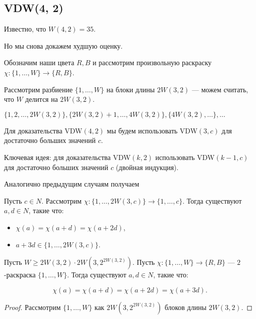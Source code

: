 \begin{normalsize}

\subsection{VDW(4, 2)}

Известно, что $W(4, 2) = 35$.

Но мы снова докажем худшую оценку.

Обозначим наши цвета $R, B$ и рассмотрим произвольную раскраску $\chi: \{1, \ldots, W\} \to \{R, B\}$.

Рассмотрим разбиение $\{1, \ldots, W\}$ на блоки длины $2W(3, 2)$ --- можем считать, что $W$ делится на $2W(3, 2)$.

$\{1, 2, \ldots, 2W(3, 2)\}, \{2W(3, 2)+1, \ldots, 4W(3, 2)\}, \{4W(3, 2), \ldots\}, \ldots$

Для доказательства VDW$(4, 2)$ мы будем использовать VDW$(3, c)$ для достаточно больших значений $c$.

Ключевая идея: для доказательства VDW$(k, 2)$ использовать VDW$(k-1, c)$ для достаточно больших значений $c$ (двойная индукция).

Аналогично предыдущим случаям получаем

\begin{lemma}
    Пусть $c \in N$. Рассмотрим $\chi: \{1, \ldots, 2W(3, c)\} \to \{1, \ldots, c\}$. Тогда существуют $a, d \in N$, такие что:

    \begin{itemize}
        \item $\chi(a) = \chi(a + d) = \chi(a + 2d)$,
        
        \item $a + 3d \in \{1, \ldots, 2W(3, c)\}$.
    \end{itemize}
\end{lemma}

\begin{theorem}
    Пусть $W \geq 2W(3, 2) \cdot 2W(3, 2^{2W(3, 2)})$. Пусть $\chi: \{1, \ldots, W\} \to \{R, B\}$ --- $2$-раскраска $\{1, \ldots, W\}$. Тогда существуют $a, d \in N$, такие что:

    \[ \chi(a) = \chi(a + d) = \chi(a + 2d) = \chi(a + 3d). \]
\end{theorem}

\begin{proof}
    
    Рассмотрим $\{1, \ldots, W\}$ как $2W(3, 2^{2W(3, 2)})$ блоков длины $2W(3, 2)$.


\end{proof}
\end{normalsize}
